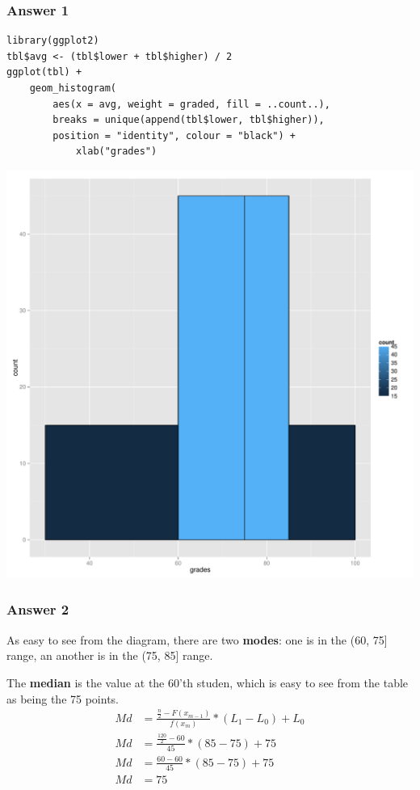 \documentclass[11pt]{article}
\begin{document}
\subsubsection{Answer 1}
\label{sec-1-1-1}

\lstset{language=R,label=students-histogram,numbers=none}
\begin{lstlisting}
library(ggplot2)
tbl$avg <- (tbl$lower + tbl$higher) / 2
ggplot(tbl) + 
    geom_histogram(
        aes(x = avg, weight = graded, fill = ..count..), 
        breaks = unique(append(tbl$lower, tbl$higher)),
        position = "identity", colour = "black") +
            xlab("grades")
\end{lstlisting}

\includegraphics[width=.9\linewidth]{images/students.pdf}
\subsubsection{Answer 2}
\label{sec-1-1-2}
As easy to see from the diagram, there are two \textbf{modes}: one is in the
(60, 75] range, an another is in the (75, 85] range.

The \textbf{median} is the value at the 60'th studen, which is easy to see
from the table as being the 75 points.
\begin{equation*}
  \begin{aligned}
    Md &= \frac{\frac{n}{2} - F(x_{m-1})}{f(x_m)} * (L_1-L_0)+L_0 \\
    Md &= \frac{\frac{120}{2} - 60}{45} * (85 - 75) + 75 \\
    Md &= \frac{60 - 60}{45} * (85 - 75) + 75 \\
    Md &= 75
  \end{aligned}
\end{equation*}
\end{document}
